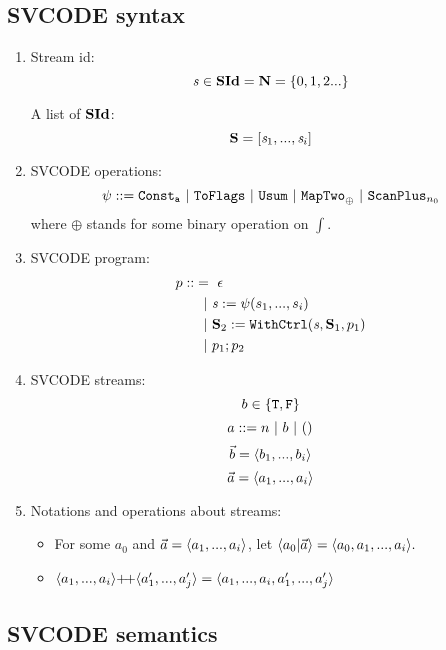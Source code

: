 \subsection{SVCODE syntax}
\begin{enumerate}[(1)]
\item Stream id: $$\s \in \SId = \*{N} = \{0,1,2...\}$$

A list of $\SId$: 
$$\S = [\s_1,..., \s_i] $$
 
\item SVCODE operations: $$\psi ::= \consta{a} \ | \ \toflag
\ | \ \usum \ | \ \maptwo{\oplus} \ | \ \scan_{n_0} $$
where $\oplus$ stands for some binary operation on $\int$. \\


\item SVCODE program: 
\begin{align*}
	p :: & = \ \epsilon \\
	     &\ \ | \ \sdef{\s}{\psi(s_1,...,s_i)} \\
	     &\ \ | \ \withctrl{\s}{p_1}{\S_1}{\S_2} \\
	     &\ \ | \ p_1;p_2 	 
\end{align*}



\item SVCODE streams: 
$$b \in \{\T,\F \}$$
$$ a ::= n \ | \ b \ | \ \unit$$
$$\b = \vrange{b_1}{b_i}$$ 
$$\a = \vrange{a_1}{a_i}  $$


\item Notations and operations about streams:
\begin{itemize}
	\item For some $a_0$ and $\a = \< a_1,...,a_i \'>$, let $\< a_0 | \a \'>  = \< a_0,a_1,...,a_i \'>. $ 

	\item $\vapp{\vrange{a_1}{a_i}} {\vrange{a_1'}{a_j'}} = \langle a_1,...,a_i,a_1',...,a_j' \rangle $ \\


\end{itemize}

\end{enumerate}

\subsection{SVCODE semantics}

